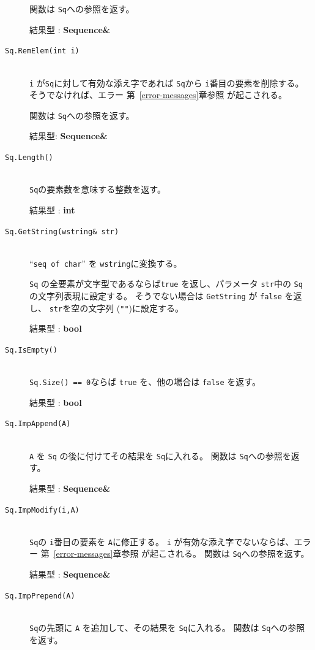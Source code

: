 \documentclass[\pformat,12pt]{jarticle}
\begin{document}
\begin{description}
     関数は {\tt Sq}への参照を返す。

     結果型 : {\bf Sequence\&}

\item[{\tt Sq.RemElem(int i)}] \mbox{}\\
      {\tt i} が{\tt Sq}に対して有効な添え字であれば {\tt Sq}から {\tt i}番目の要素を削除する。
 そうでなければ、エラー 第~\ref{error-messages}章参照 が起こされる。

  関数は {\tt Sq}への参照を返す。

     結果型: {\bf Sequence\&}

\item[{\tt Sq.Length()}] \mbox{}\\     
     {\tt Sq}の要素数を意味する整数を返す。

     結果型 : {\bf int}

\item[{\tt Sq.GetString(wstring\& str)}] \mbox{}\\     
   ``{\tt seq of char}'' を {\tt wstring}に変換する。

  {\tt Sq} の全要素が文字型であるならば{\tt true} を返し、パラメータ {\tt str}中の {\tt Sq} の文字列表現に設定する。 
 そうでない場合は {\tt GetString} が {\tt false} を返し、 {\tt str}を空の文字列 ({\tt ""})に設定する。
  
  結果型 : {\bf bool}

\item[{\tt Sq.IsEmpty()}] \mbox{}\\     
      {\tt Sq.Size() == 0}ならば {\tt true} を、他の場合は {\tt false} を返す。

     結果型 : {\bf bool}

\item[{\tt Sq.ImpAppend(A)}] \mbox{}\\     
     {\tt A} を {\tt Sq} の後に付けてその結果を {\tt Sq}に入れる。
     関数は {\tt Sq}への参照を返す。

     結果型 : {\bf Sequence\&}

\item[{\tt Sq.ImpModify(i,A)}] \mbox{}\\     
     {\tt Sq}の {\tt i}番目の要素を {\tt A}に修正する。 
 {\tt i} が有効な添え字でないならば、エラー 第~\ref{error-messages}章参照 が起こされる。
     関数は {\tt Sq}への参照を返す。

     結果型 : {\bf Sequence\&}

\item[{\tt Sq.ImpPrepend(A)}] \mbox{}\\     
      {\tt Sq}の先頭に {\tt A} を追加して、その結果を {\tt Sq}に入れる。
     関数は {\tt Sq}への参照を返す。


\end{description}
\end{document}
